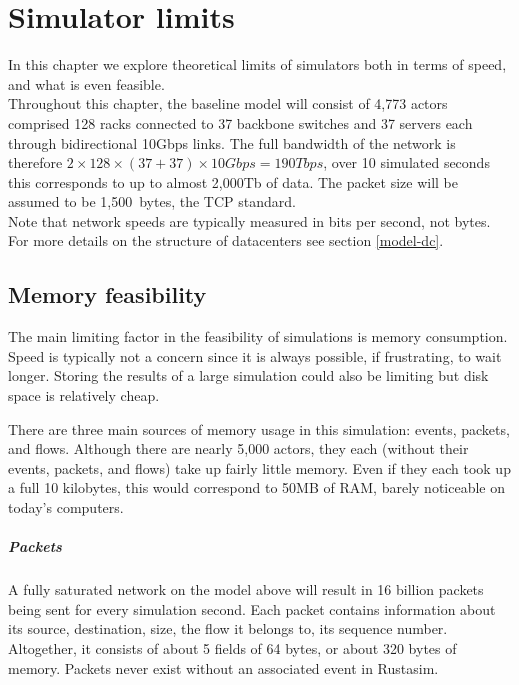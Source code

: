 \chapter{Simulator limits} \label{limits}

In this chapter we explore theoretical limits of simulators both in terms of speed, and what is even feasible.
\\

Throughout this chapter, the baseline model will consist of 4,773 actors comprised 128 racks connected to 37 backbone switches and 37 servers each through bidirectional 10Gbps links.
The full bandwidth of the network is therefore $2\times128\times(37+37)\times10Gbps = 190Tbps$, over 10 simulated seconds this corresponds to up to almost 2,000Tb of data.
The packet size will be assumed to be 1,500~bytes, the TCP standard. \\
Note that network speeds are typically measured in bits per second, not bytes.
For more details on the structure of datacenters see section \ref{model-dc}.

\section{Memory feasibility} \label{limits-mem}

The main limiting factor in the feasibility of simulations is memory consumption.
Speed is typically not a concern since it is always possible, if frustrating, to wait longer.
Storing the results of a large simulation could also be limiting but disk space is relatively cheap.

There are three main sources of memory usage in this simulation: events, packets, and flows.
Although there are nearly 5,000 actors, they each (without their events, packets, and flows) take up fairly little memory.
Even if they each took up a full 10 kilobytes, this would correspond to 50MB of RAM, barely noticeable on today's computers.

\paragraph{Packets}
A fully saturated network on the model above will result in 16 billion packets being sent for every simulation second.
Each packet contains information about its source, destination, size, the flow it belongs to, its sequence number.
Altogether, it consists of about 5 fields of 64 bytes, or about 320 bytes of memory.
Packets never exist without an associated event in Rustasim.


